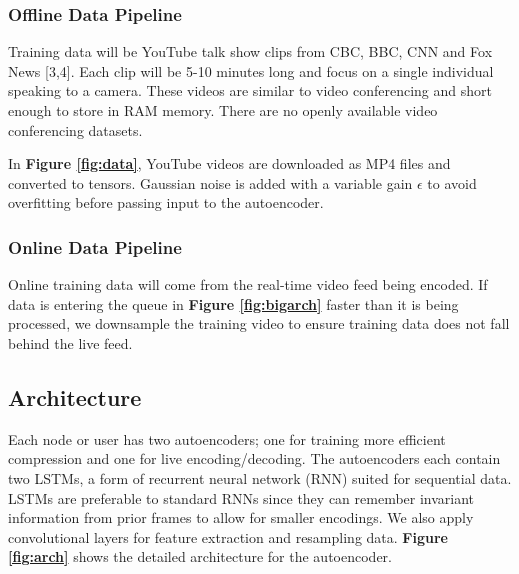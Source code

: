 \documentclass[letter, 12pt]{article}
\begin{document}
\subsubsection{Offline Data Pipeline}

Training data will be YouTube talk show clips from CBC, BBC, CNN and Fox News [3,4]. Each clip will be 5-10 minutes long and focus on a single individual speaking to a camera. These videos are similar to video conferencing and short enough to store in RAM memory. There are no openly available video conferencing datasets.

In\textbf{ Figure \ref{fig:data}}, YouTube videos are downloaded as MP4 files and converted to tensors. Gaussian noise is added with a variable gain $\epsilon$ to avoid overfitting before passing input to the autoencoder.

\subsubsection{Online Data Pipeline}

Online training data will come from the real-time video feed being encoded. If data is entering the queue in \textbf{Figure \ref{fig:bigarch}} faster than it is being processed, we downsample the training video to ensure training data does not fall behind the live feed.

\subsection{Architecture}

Each node or user has two autoencoders; one for training more efficient compression and one for live encoding/decoding. The autoencoders each contain two LSTMs, a form of recurrent neural network (RNN) suited for sequential data. LSTMs are preferable to standard RNNs since they can remember invariant information from prior frames to allow for smaller encodings. We also apply convolutional layers for feature extraction and resampling data. \textbf{Figure \ref{fig:arch}} shows the detailed architecture for the autoencoder. 
\end{document}
